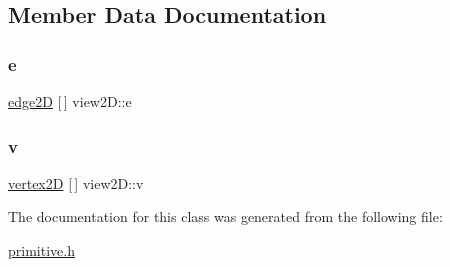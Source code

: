 \subsection{Member Data Documentation}
\mbox{\label{classview2_d_a3a6ad7e000ebbcf7caefe3767dfc036b}} 
\subsubsection{\texorpdfstring{e}{e}}
{\footnotesize\ttfamily \mbox{\hyperlink{classedge2_d}{edge2D}} \mbox{[}$\,$\mbox{]} view2\+D\+::e}

\mbox{\label{classview2_d_abde5a351bf6796ae8149a3f00a783caa}} 
\subsubsection{\texorpdfstring{v}{v}}
{\footnotesize\ttfamily \mbox{\hyperlink{classvertex2_d}{vertex2D}} \mbox{[}$\,$\mbox{]} view2\+D\+::v}



The documentation for this class was generated from the following file\+:\begin{DoxyCompactItemize}
\item 
\mbox{\hyperlink{primitive_8h}{primitive.\+h}}\end{DoxyCompactItemize}
